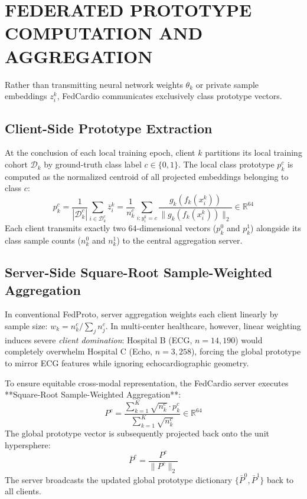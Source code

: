 \documentclass[12pt,a4paper]{amritareport}
\begin{document}
\section{FEDERATED PROTOTYPE COMPUTATION AND AGGREGATION}

Rather than transmitting neural network weights $\theta_k$ or private sample embeddings $z_i^k$, FedCardio communicates exclusively class prototype vectors.

\subsection{Client-Side Prototype Extraction}
At the conclusion of each local training epoch, client $k$ partitions its local training cohort $\mathcal{D}_k$ by ground-truth class label $c \in \{0, 1\}$. The local class prototype $p_k^c$ is computed as the normalized centroid of all projected embeddings belonging to class $c$:
\begin{equation}
	p_k^c = \frac{1}{|\mathcal{D}_k^c|} \sum_{i \in \mathcal{D}_k^c} \bar{z}_i^k = \frac{1}{n_k^c} \sum_{i: y_i^k = c} \frac{g_k(f_k(x_i^k))}{\|g_k(f_k(x_i^k))\|_2} \in \mathbb{R}^{64}
\end{equation}
Each client transmits exactly two 64-dimensional vectors ($p_k^0$ and $p_k^1$) alongside its class sample counts ($n_k^0$ and $n_k^1$) to the central aggregation server.

\subsection{Server-Side Square-Root Sample-Weighted Aggregation}
In conventional FedProto, server aggregation weights each client linearly by sample size: $w_k = n_k^c / \sum_j n_j^c$. In multi-center healthcare, however, linear weighting induces severe \textit{client domination}: Hospital B (ECG, $n=14,190$) would completely overwhelm Hospital C (Echo, $n=3,258$), forcing the global prototype to mirror ECG features while ignoring echocardiographic geometry.

To ensure equitable cross-modal representation, the FedCardio server executes **Square-Root Sample-Weighted Aggregation**:
\begin{equation}
	P^c = \frac{\sum_{k=1}^{K} \sqrt{n_k^c} \cdot p_k^c}{\sum_{k=1}^{K} \sqrt{n_k^c}} \in \mathbb{R}^{64}
\end{equation}
The global prototype vector is subsequently projected back onto the unit hypersphere:
\begin{equation}
	\bar{P}^c = \frac{P^c}{\|P^c\|_2}
\end{equation}
The server broadcasts the updated global prototype dictionary $\{\bar{P}^0, \bar{P}^1\}$ back to all clients.
\end{document}
